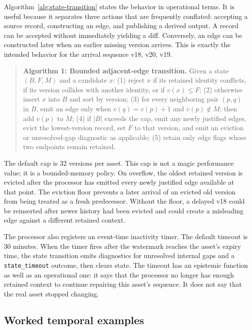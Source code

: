 Algorithm~\ref{alg:state-transition} states the behavior in operational terms. It is useful because it separates three actions that are frequently conflated: accepting a source record, constructing an edge, and publishing a derived output. A record can be accepted without immediately yielding a diff. Conversely, an edge can be constructed later when an earlier missing version arrives. This is exactly the intended behavior for the arrival sequence v18, v20, v19.

\begin{quote}
\textbf{Algorithm 1: Bounded adjacent-edge transition.} Given a state $(B,F,M)$ and a candidate $x$: (1) reject $x$ if its retained identity conflicts, if its version collides with another identity, or if $v(x)\leq F$; (2) otherwise insert $x$ into $B$ and sort by version; (3) for every neighboring pair $(p,q)$ in $B$, emit an edge only when $v(q)=v(p)+1$ and $v(p)\notin M$; then add $v(p)$ to $M$; (4) if $|B|$ exceeds the cap, emit any newly justified edges, evict the lowest-version record, set $F$ to that version, and emit an eviction or unresolved-gap diagnostic as applicable; (5) retain only edge flags whose two endpoints remain retained.\label{alg:state-transition}
\end{quote}

The default cap is 32 versions per asset. This cap is not a magic performance value; it is a bounded-memory policy. On overflow, the oldest retained version is evicted after the processor has emitted every newly justified edge available at that point. The eviction floor prevents a later arrival of an evicted old version from being treated as a fresh predecessor. Without the floor, a delayed v18 could be reinserted after newer history had been evicted and could create a misleading edge against a different retained context.

The processor also registers an event-time inactivity timer. The default timeout is 30 minutes. When the timer fires after the watermark reaches the asset's expiry time, the state transition emits diagnostics for unresolved internal gaps and a \texttt{state\_timeout} outcome, then clears state. The timeout has an epistemic function as well as an operational one: it says that the processor no longer has enough retained context to continue repairing this asset's sequence. It does not say that the real asset stopped changing.

\subsection{Worked temporal examples}

